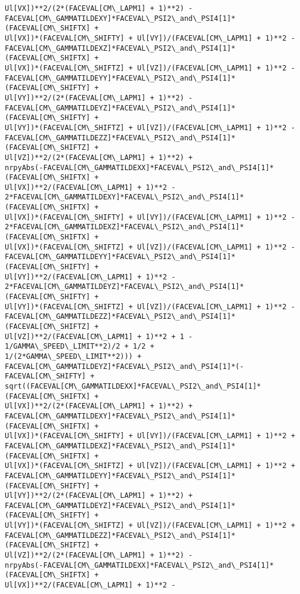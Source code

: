 \documentclass[landscape,letterpaper,10pt,english]{article}
\begin{document}
\begin{Verbatim}[commandchars=\\\{\}]
Ul[VX])**2/(2*(FACEVAL[CM\_LAPM1] + 1)**2) -
FACEVAL[CM\_GAMMATILDEXY]*FACEVAL\_PSI2\_and\_PSI4[1]*(FACEVAL[CM\_SHIFTX] +
Ul[VX])*(FACEVAL[CM\_SHIFTY] + Ul[VY])/(FACEVAL[CM\_LAPM1] + 1)**2 -
FACEVAL[CM\_GAMMATILDEXZ]*FACEVAL\_PSI2\_and\_PSI4[1]*(FACEVAL[CM\_SHIFTX] +
Ul[VX])*(FACEVAL[CM\_SHIFTZ] + Ul[VZ])/(FACEVAL[CM\_LAPM1] + 1)**2 -
FACEVAL[CM\_GAMMATILDEYY]*FACEVAL\_PSI2\_and\_PSI4[1]*(FACEVAL[CM\_SHIFTY] +
Ul[VY])**2/(2*(FACEVAL[CM\_LAPM1] + 1)**2) -
FACEVAL[CM\_GAMMATILDEYZ]*FACEVAL\_PSI2\_and\_PSI4[1]*(FACEVAL[CM\_SHIFTY] +
Ul[VY])*(FACEVAL[CM\_SHIFTZ] + Ul[VZ])/(FACEVAL[CM\_LAPM1] + 1)**2 -
FACEVAL[CM\_GAMMATILDEZZ]*FACEVAL\_PSI2\_and\_PSI4[1]*(FACEVAL[CM\_SHIFTZ] +
Ul[VZ])**2/(2*(FACEVAL[CM\_LAPM1] + 1)**2) +
nrpyAbs(-FACEVAL[CM\_GAMMATILDEXX]*FACEVAL\_PSI2\_and\_PSI4[1]*(FACEVAL[CM\_SHIFTX] +
Ul[VX])**2/(FACEVAL[CM\_LAPM1] + 1)**2 -
2*FACEVAL[CM\_GAMMATILDEXY]*FACEVAL\_PSI2\_and\_PSI4[1]*(FACEVAL[CM\_SHIFTX] +
Ul[VX])*(FACEVAL[CM\_SHIFTY] + Ul[VY])/(FACEVAL[CM\_LAPM1] + 1)**2 -
2*FACEVAL[CM\_GAMMATILDEXZ]*FACEVAL\_PSI2\_and\_PSI4[1]*(FACEVAL[CM\_SHIFTX] +
Ul[VX])*(FACEVAL[CM\_SHIFTZ] + Ul[VZ])/(FACEVAL[CM\_LAPM1] + 1)**2 -
FACEVAL[CM\_GAMMATILDEYY]*FACEVAL\_PSI2\_and\_PSI4[1]*(FACEVAL[CM\_SHIFTY] +
Ul[VY])**2/(FACEVAL[CM\_LAPM1] + 1)**2 -
2*FACEVAL[CM\_GAMMATILDEYZ]*FACEVAL\_PSI2\_and\_PSI4[1]*(FACEVAL[CM\_SHIFTY] +
Ul[VY])*(FACEVAL[CM\_SHIFTZ] + Ul[VZ])/(FACEVAL[CM\_LAPM1] + 1)**2 -
FACEVAL[CM\_GAMMATILDEZZ]*FACEVAL\_PSI2\_and\_PSI4[1]*(FACEVAL[CM\_SHIFTZ] +
Ul[VZ])**2/(FACEVAL[CM\_LAPM1] + 1)**2 + 1 - 1/GAMMA\_SPEED\_LIMIT**2)/2 + 1/2 +
1/(2*GAMMA\_SPEED\_LIMIT**2))) +
FACEVAL[CM\_GAMMATILDEYZ]*FACEVAL\_PSI2\_and\_PSI4[1]*(-FACEVAL[CM\_SHIFTY] +
sqrt((FACEVAL[CM\_GAMMATILDEXX]*FACEVAL\_PSI2\_and\_PSI4[1]*(FACEVAL[CM\_SHIFTX] +
Ul[VX])**2/(2*(FACEVAL[CM\_LAPM1] + 1)**2) +
FACEVAL[CM\_GAMMATILDEXY]*FACEVAL\_PSI2\_and\_PSI4[1]*(FACEVAL[CM\_SHIFTX] +
Ul[VX])*(FACEVAL[CM\_SHIFTY] + Ul[VY])/(FACEVAL[CM\_LAPM1] + 1)**2 +
FACEVAL[CM\_GAMMATILDEXZ]*FACEVAL\_PSI2\_and\_PSI4[1]*(FACEVAL[CM\_SHIFTX] +
Ul[VX])*(FACEVAL[CM\_SHIFTZ] + Ul[VZ])/(FACEVAL[CM\_LAPM1] + 1)**2 +
FACEVAL[CM\_GAMMATILDEYY]*FACEVAL\_PSI2\_and\_PSI4[1]*(FACEVAL[CM\_SHIFTY] +
Ul[VY])**2/(2*(FACEVAL[CM\_LAPM1] + 1)**2) +
FACEVAL[CM\_GAMMATILDEYZ]*FACEVAL\_PSI2\_and\_PSI4[1]*(FACEVAL[CM\_SHIFTY] +
Ul[VY])*(FACEVAL[CM\_SHIFTZ] + Ul[VZ])/(FACEVAL[CM\_LAPM1] + 1)**2 +
FACEVAL[CM\_GAMMATILDEZZ]*FACEVAL\_PSI2\_and\_PSI4[1]*(FACEVAL[CM\_SHIFTZ] +
Ul[VZ])**2/(2*(FACEVAL[CM\_LAPM1] + 1)**2) -
nrpyAbs(-FACEVAL[CM\_GAMMATILDEXX]*FACEVAL\_PSI2\_and\_PSI4[1]*(FACEVAL[CM\_SHIFTX] +
Ul[VX])**2/(FACEVAL[CM\_LAPM1] + 1)**2 -

\end{Verbatim}
\end{document}
